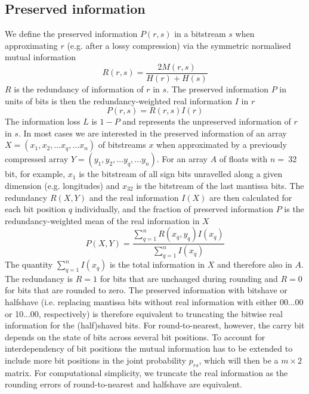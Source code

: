 \subsection{Preserved information}

We define the preserved information $P(r,s)$ in a bitstream $s$ when approximating $r$ (e.g. after a lossy compression) via the
symmetric normalised mutual information
	\begin{equation}
	R(r,s) = \frac{2M(r,s)}{H(r) + H(s)}
	\end{equation}
$R$ is the redundancy of information of $r$ in $s$. The preserved information $P$ in units of bits is then the redundancy-weighted real information
$I$ in $r$
	\begin{equation}
	P(r,s) = R(r,s)I(r)
	\end{equation}
The information loss $L$ is $1-P$ and represents the unpreserved information of $r$ in $s$. In most cases we are interested in the preserved
information of an array $X = (x_1,x_2,...x_q,...x_n)$ of bitstreams $x$ when approximated by a previously compressed array $Y = (y_1,y_2,...y_q,...y_n)$.
For an array $A$ of floats with $n=~$32 bit, for example, $x_1$ is the bitstream of all sign bits unravelled along a given dimension (e.g. longitudes) and  $x_{32}$
is the bitstream of the last mantissa bits. The redundancy $R(X,Y)$ and the real information $I(X)$ are then calculated for each bit position $q$ individually,
and the fraction of preserved information $P$ is the redundancy-weighted mean of the real information in $X$
	\begin{equation}
	P(X,Y) = \frac{ \sum_{q=1}^n R(x_q,y_q)I(x_q)}{\sum_{q=1}^n I(x_q)}
	\end{equation}
The quantity $\sum_{q=1}^nI(x_q)$ is the total information in $X$ and therefore also in $A$. The redundancy is $R=1$ for bits that are
unchanged during rounding and $R=0$ for bits that are rounded to zero. The preserved information with bitshave or halfshave
\citep{Zender2016,Kouznetsov2020}
(i.e. replacing mantissa bits without real information with either 00...00 or 10...00, respectively) is therefore equivalent to truncating
the bitwise real information for the (half)shaved bits. For round-to-nearest, however, the carry bit depends on the state of bits across 
several bit positions. To account for interdependency of bit positions the mutual information has to be extended to include more bit
positions in the joint probability $p_{rs}$, which will then be a $m \times 2$ matrix. For computational simplicity, we truncate the
real information as the rounding errors of round-to-nearest and halfshave are equivalent.

